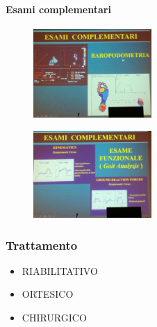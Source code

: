 \paragraph{Esami complementari}

\begin{figure}[!ht]
\centering
\includegraphics[width=0.4\textwidth]{017/image12.jpg}
\end{figure}

\begin{figure}[!ht]
\centering
\includegraphics[width=0.4\textwidth]{017/image13.jpg}
\end{figure}

\subsubsection{Trattamento}

\begin{itemize}
\item
  RIABILITATIVO
\item
  ORTESICO~
\item
  CHIRURGICO
\end{itemize}

